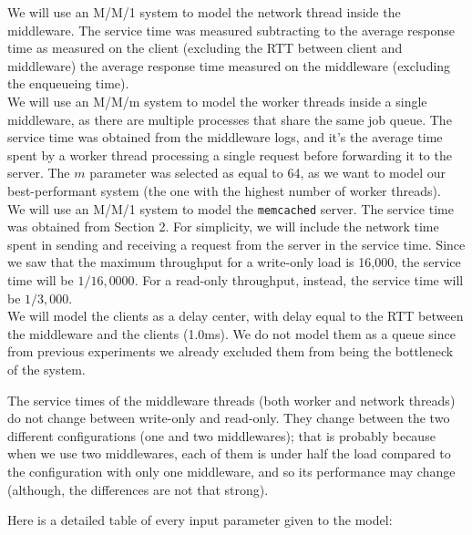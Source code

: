 \documentclass[11pt,a4paper]{article}
\renewcommand{\t}[1]{%
	{\texttt{#1}}}
\begin{document}
We will use an M/M/1 system to model the network thread inside the middleware.
The service time was measured subtracting to the average response time as measured 
on the client (excluding the RTT between client and middleware) the average
response time measured on the middleware (excluding the enqueueing time). \\

We will use an M/M/m system to model the worker threads inside a single middleware,
as there are multiple processes that share the same job queue.
The service time was obtained from the middleware logs, and it's the average time
spent by a worker thread processing a single request before forwarding it to the server.
The $m$ parameter was selected as equal to 64, as we want to model our best-performant system
(the one with the highest number of worker threads).\\

We will use an M/M/1 system to model the \t{memcached} server.
The service time was obtained from Section 2. For simplicity, we will
include the network time spent in sending and receiving a request from the server
in the service time.
Since we saw that the maximum throughput
for a write-only load is 16,000, the service time will be $1 / 16,0000$. For a read-only
throughput, instead, the service time will be $1 / 3,000$.  \\

We will model the clients as a delay center, with delay equal to the RTT between the middleware
and the clients (1.0ms). We do not model them as a queue since from previous experiments
we already excluded them from being the bottleneck of the system.

The service times of the middleware threads (both worker and network threads) do not change
between write-only and read-only. They change between the two different configurations (one and
two middlewares); that is probably because when we use two middlewares, each of them is 
under half the load compared to the configuration with only one middleware, and so its performance
may change (although, the differences are not that strong).

Here is a detailed table of every input parameter given to the model:
\end{document}
